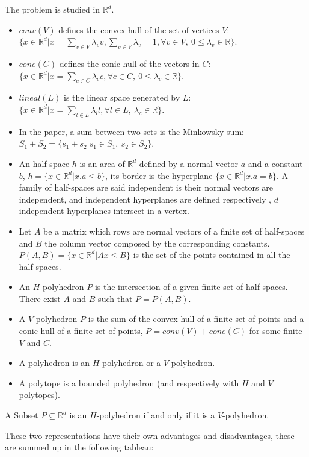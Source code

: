 \begin{definition}
	The problem is studied in $\mathbb{R}^d$.
	\begin{itemize}
	\item $conv(V)$ defines the convex hull of the set of vertices $V$: $\{ x\in\mathbb{R}^d| x=\sum_{v\in V} \lambda_v v, \sum_{v\in V} \lambda_v =1, \forall v \in V, \ 0\leq \lambda_v \in \mathbb{R} \}$.
	\item $cone(C)$ defines the conic hull of the vectors in $C$: $\{ x\in\mathbb{R}^d| x=\sum_{c\in C} \lambda_c c, \forall c \in C,\ 0\leq \lambda_c \in \mathbb{R} \}$.
	\item $lineal(L)$ is the linear space generated by $L$: $\{ x\in\mathbb{R}^d| x=\sum_{l\in L} \lambda_l l, \forall l \in L,\ \lambda_c \in \mathbb{R} \}$. 
	\item In the paper, a sum between two sets is the Minkowsky sum: $S_1+S_2=\{s_1+s_2|s_1\in S_1,\ s_2 \in S_2 \}$.
	\item An half-space $h$ is an area of $\mathbb{R}^d$ defined by a normal vector $a$ and a constant $b$, $h=\{x\in\mathbb{R}^d|x.a\leq b\}$, its border is the hyperplane $\{x\in\mathbb{R}^d|x.a = b\}$. A family of half-spaces are said independent is their normal vectors are independent, and independent hyperplanes are defined respectively , $d$ independent hyperplanes intersect in a vertex.
	\item Let $A$ be a matrix which rows are normal vectors of a finite set of half-spaces and $B$ the column vector composed by the corresponding constants. $P(A,B)=\{x\in\mathbb{R}^d|Ax\leq B\}$ is the set of the points contained in all the half-spaces.
	\item An $H$-polyhedron $P$ is the intersection of a given finite set of half-spaces. There exist $A$ and $B$ such that $P=P(A,B)$.
	\item A $V$-polyhedron $P$ is the sum of the convex hull of a finite set of points and a conic hull of a finite set of points, $P=conv(V)+cone(C)$ for some finite $V$ and $C$.
	\item A polyhedron is an $H$-polyhedron or a $V$-polyhedron.
	\item A polytope is a bounded polyhedron (and respectively with $H$ and $V$ polytopes).
	\end{itemize}
\end{definition}


\begin{theorem}
A Subset $P\subseteq\mathbb{R}^d$ is an $H$-polyhedron if and only if it is a $V$-polyhedron.
\label{thm_representation}
\end{theorem} 
These two representations have their own advantages and disadvantages, these are summed up in the following tableau:

